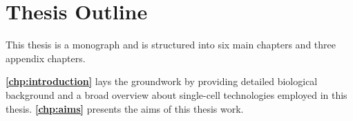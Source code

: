 
\chapter{Thesis Outline}
\label{chp:outline}


\par This thesis is a monograph and is structured into six main chapters and three appendix chapters.\\

\par \textbf{\autoref{chp:introduction}} lays the groundwork by providing detailed biological background and a broad overview about single-cell technologies employed in this thesis. \textbf{\autoref{chp:aims}} presents the aims of this thesis work.\\

